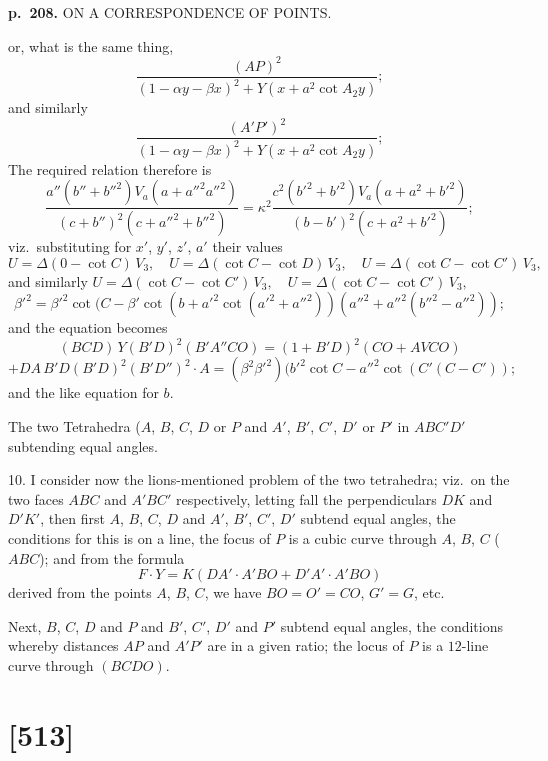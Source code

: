 \documentclass[11pt,a4paper]{article}
\begin{document}
\clearpage

\noindent
\textbf{p.~208.}  ON A CORRESPONDENCE OF POINTS.

or, what is the same thing,
\[
\frac{(AP)^2}{(1 - \alpha y - \beta x)^2 + Y(x + a^2 \cot A_2 y)};
\]
and similarly
\[
\frac{(A'P')^2}{(1 - \alpha y - \beta x)^2 + Y(x + a^2 \cot A_2 y)};
\]
The required relation therefore is
\[
\frac{a''(b'' + b''^2)V_a (a + a''^2 a''^2)}{(c + b'')^2 (c + a''^2 + b''^2)} = \kappa^2 \frac{c^2(b'^2 + b'^2)V_a (a + a^2 + b'^2)}{(b - b')^2 (c + a^2 + b'^2)};
\]
viz.\ substituting for $x'$, $y'$, $z'$, $a'$ their values
\[
U = \Delta(0 - \cot C)\,V_3, \quad U = \Delta(\cot C - \cot D)\,V_3, \quad U = \Delta(\cot C - \cot C')\,V_3,
\]
and similarly $U = \Delta(\cot C - \cot C')\,V_3, \quad U = \Delta(\cot C - \cot C')\,V_3,$
\[
\beta'^2 = \beta'^2 \cot(C - \beta' \cot(b + a'^2 \cot(a'^2 + a''^2 ))(a''^2 + a''^2(b''^2 - a''^2));
\]
and the equation becomes
\[
(BCD)\,Y(B'D)^2 (B'A''CO) = (1 + B'D)^2 (CO + AVCO)
\]
\[
+ DA\,B'D(B'D)^2 (B'D'')^2 \cdot A = (\beta^2 \beta'^2)(b'^2 \cot C - a''^2 \cot(C'(C - C'));
\]
and the like equation for $b$.

The two Tetrahedra ($A$, $B$, $C$, $D$ or $P$ and $A'$, $B'$, $C'$, $D'$ or $P'$ in $ABC'D'$ subtending equal angles.

10. I consider now the lions-mentioned problem of the two tetrahedra; viz.\ on the two faces $ABC$ and $A'BC'$ respectively, letting fall the perpendiculars $DK$ and $D'K'$, then first $A$, $B$, $C$, $D$ and $A'$, $B'$, $C'$, $D'$ subtend equal angles, the conditions for this is on a line, the focus of $P$ is a cubic curve through $A$, $B$, $C$ ($ABC$); and from the formula
\[
F \cdot Y = K (DA' \cdot A'BO + D'A' \cdot A'BO)
\]
derived from the points $A$, $B$, $C$, we have $BO = O' = CO$, $G' = G$, etc.

Next, $B$, $C$, $D$ and $P$ and $B'$, $C'$, $D'$ and $P'$ subtend equal angles, the conditions whereby distances $AP$ and $A'P'$ are in a given ratio; the locus of $P$ is a $12$-line curve through $(BCDO)$.


\clearpage

\section{[513]}
\end{document}
